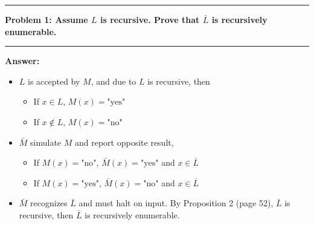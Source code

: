 \documentclass[11pt]{article}
\newcommand\question[2]{\vspace{.25in}\hrule\textbf{#1: #2}\vspace{.5em}\hrule\vspace{.10in}}
\renewcommand\part[1]{\vspace{.10in}\textbf{#1}}
\newcommand\algorithm{\vspace{.10in}\textbf{Algorithm: }}
\newcommand\correctness{\vspace{.10in}\textbf{Correctness: }}
\newcommand\runtime{\vspace{.10in}\textbf{Running time: }}
\begin{document}
\raggedright
\newcommand\NAME{Shiang-Yun Yang 楊翔雲}  %
\newcommand\ANDREWID{R04922067}     %
\newcommand\HWNUM{2}              %



\question{Problem 1}{Assume $L$ is recursive. Prove that $\bar{L}$ is recursively enumerable.}

\part{Answer:} %

\begin{itemize}

\item 
$L$ is accepted by $M$, and due to $L$ is recursive, then
\begin{itemize}
	\item If $x \in L$, $M(x) = \text{"yes"}$		\item If $x \notin L$, $M(x) = \text{"no"}$
\end{itemize}

\item 
$\bar{M}$ simulate $M$ and report opposite result,
\begin{itemize}
	\item If $M(x) = \text{"no"}$, $\bar{M}(x) = \text{"yes"}$ and $x \in \bar{L}$ 
	\item If $M(x) = \text{"yes"}$, $\bar{M}(x) = \text{"no"}$ and $x \in \bar{L}$ 
\end{itemize}

\item $\bar{M}$ recognizes $\bar{L}$ and must halt on input. By Proposition 2 (page 52), $\bar{L}$ is recursive, then $\bar{L}$ is recursively enumerable.

\end{itemize}



\end{document}
